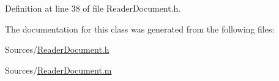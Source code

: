 Definition at line 38 of file Reader\-Document.\-h.



The documentation for this class was generated from the following files\-:\begin{DoxyCompactItemize}
\item 
Sources/\hyperlink{_reader_document_8h}{Reader\-Document.\-h}\item 
Sources/\hyperlink{_reader_document_8m}{Reader\-Document.\-m}\end{DoxyCompactItemize}
